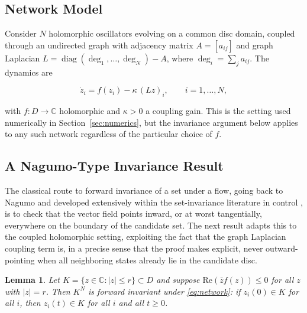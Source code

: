 \documentclass[preprint,12pt,authoryear]{elsarticle}
\newtheorem{lemma}{Lemma} %
\begin{document}
\subsection{Network Model}

Consider $N$ holomorphic oscillators evolving on a common disc domain, coupled through an undirected graph with adjacency matrix $A=[a_{ij}]$ and graph Laplacian $L=\operatorname{diag}(\deg_1,\dots,\deg_N)-A$, where $\deg_i=\sum_ja_{ij}$. The dynamics are

\begin{equation}
\dot z_i = f(z_i) - \kappa\,(Lz)_i, \qquad i=1,\dots,N, \label{eq:network}
\end{equation}

with $f:D\to\mathbb{C}$ holomorphic and $\kappa>0$ a coupling gain. This is the setting used numerically in Section~\ref{sec:numerics}, but the invariance argument below applies to any such network regardless of the particular choice of $f$.

\subsection{A Nagumo-Type Invariance Result}

The classical route to forward invariance of a set under a flow, going back to Nagumo and developed extensively within the set-invariance literature in control \cite{blanchini1999invariance}, is to check that the vector field points inward, or at worst tangentially, everywhere on the boundary of the candidate set. The next result adapts this to the coupled holomorphic setting, exploiting the fact that the graph Laplacian coupling term is, in a precise sense that the proof makes explicit, never outward-pointing when all neighboring states already lie in the candidate disc.

\begin{lemma}
\label{lem:invariance}
Let $K=\{z\in\mathbb{C}:|z|\le r\}\subset D$ and suppose $\mathrm{Re}(\bar z f(z))\le0$ for all $z$ with $|z|=r$. Then $K^N$ is forward invariant under \eqref{eq:network}: if $z_i(0)\in K$ for all $i$, then $z_i(t)\in K$ for all $i$ and all $t\ge0$.
\end{lemma}
\end{document}
